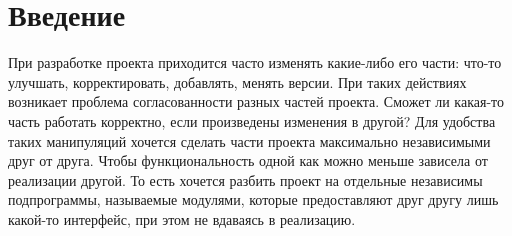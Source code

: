 \documentclass{matmex-diploma}
\begin{document}
\maketitle
\tableofcontents
\section*{Введение}
При разработке проекта приходится часто изменять какие-либо его части: что-то улучшать, корректировать, добавлять, менять версии. При таких действиях возникает проблема согласованности разных частей проекта. Сможет ли какая-то часть работать корректно, если произведены изменения в другой? Для удобства таких манипуляций хочется сделать части проекта максимально независимыми друг от друга. Чтобы функциональность одной как можно меньше зависела от реализации другой. То есть хочется разбить проект на отдельные независимы подпрограммы, называемые модулями, которые предоставляют друг другу лишь какой-то интерфейс, при этом не вдаваясь в реализацию.
\end{document}
